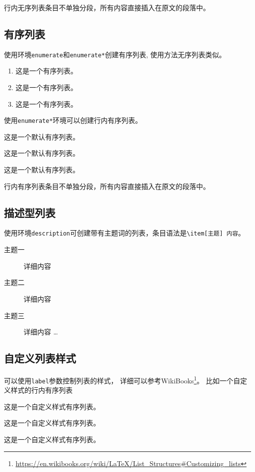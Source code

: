 \documentclass[doctor,openright,twoside]{sjtuthesis}
\theoremstyle{plain}
\theoremstyle{definition}
\theoremstyle{remark}
\theoremstyle{ocrenumbox}
\theoremstyle{plain}
\begin{document}
行内无序列表条目不单独分段，所有内容直接插入在原文的段落中。

\subsection{有序列表}
\label{sec:orderlist}

使用环境\verb+enumerate+和\verb+enumerate*+创建有序列表,
使用方法无序列表类似。

\begin{enumerate}
  \item 这是一个有序列表。
  \item 这是一个有序列表。
  \item 这是一个有序列表。
\end{enumerate}

使用\verb+enumerate*+环境可以创建行内有序列表。

\begin{enumerate*}
  \item 这是一个默认有序列表。
  \item 这是一个默认有序列表。
  \item 这是一个默认有序列表。
\end{enumerate*}

行内有序列表条目不单独分段，所有内容直接插入在原文的段落中。

\subsection{描述型列表}

使用环境\verb+description+可创建带有主题词的列表，条目语法是\verb+\item[主题] 内容+。

\begin{description}
    \item[主题一] 详细内容
    \item[主题二] 详细内容
    \item[主题三] 详细内容 \ldots
\end{description}

\subsection{自定义列表样式}

可以使用\verb+label+参数控制列表的样式，
详细可以参考WikiBooks\footnote{\url{https://en.wikibooks.org/wiki/LaTeX/List_Structures\#Customizing_lists}}。
比如一个自定义样式的行内有序列表

\begin{enumerate*}[label=\itshape\alph*)\upshape]
  \item 这是一个自定义样式有序列表。
  \item 这是一个自定义样式有序列表。
  \item 这是一个自定义样式有序列表。
\end{enumerate*}
\end{document}
